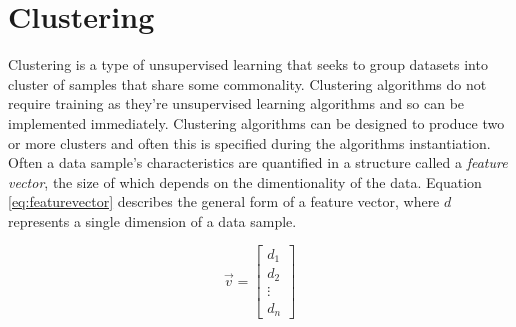 \section{Clustering}

Clustering is a type of unsupervised learning that seeks to group datasets into cluster of samples that share some commonality. Clustering algorithms do not require training as they're unsupervised learning algorithms and so can be implemented immediately. Clustering algorithms can be designed to produce two or more clusters and often this is specified during the algorithms instantiation. Often a data sample's characteristics are quantified in a structure called a \emph{feature vector}, the size of which depends on the dimentionality of the data. Equation \ref{eq:featurevector} describes the general form of a feature vector, where $d$ represents a single dimension of a data sample. 

\begin{equation}
    \vec{v} = 
    \begin{bmatrix}
        d_1 \\
        d_2 \\
        \vdots \\ 
        d_n
    \end{bmatrix}
    \label{eq:featurevector}
\end{equation}

